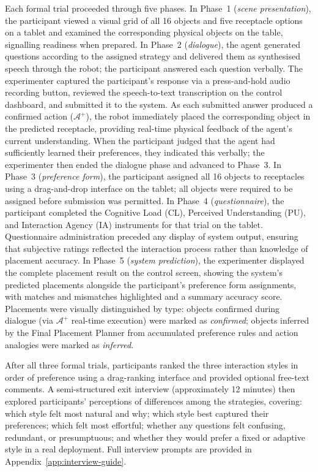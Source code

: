 \documentclass[manuscript,review,anonymous]{acmart}
\begin{document}
Each formal trial proceeded through five phases. In Phase~1 (\textit{scene presentation}), the participant viewed a visual grid of all 16 objects and five receptacle options on a tablet and examined the corresponding physical objects on the table, signalling readiness when prepared. In Phase~2 (\textit{dialogue}), the agent generated questions according to the assigned strategy and delivered them as synthesised speech through the robot; the participant answered each question verbally. The experimenter captured the participant's response via a press-and-hold audio recording button, reviewed the speech-to-text transcription on the control dashboard, and submitted it to the system. As each submitted answer produced a confirmed action ($\mathcal{A}^+$), the robot immediately placed the corresponding object in the predicted receptacle, providing real-time physical feedback of the agent's current understanding. When the participant judged that the agent had sufficiently learned their preferences, they indicated this verbally; the experimenter then ended the dialogue phase and advanced to Phase~3. In Phase~3 (\textit{preference form}), the participant assigned all 16 objects to receptacles using a drag-and-drop interface on the tablet; all objects were required to be assigned before submission was permitted. In Phase~4 (\textit{questionnaire}), the participant completed the Cognitive Load (CL), Perceived Understanding (PU), and Interaction Agency (IA) instruments for that trial on the tablet. Questionnaire administration preceded any display of system output, ensuring that subjective ratings reflected the interaction process rather than knowledge of placement accuracy. In Phase~5 (\textit{system prediction}), the experimenter displayed the complete placement result on the control screen, showing the system's predicted placements alongside the participant's preference form assignments, with matches and mismatches highlighted and a summary accuracy score. Placements were visually distinguished by type: objects confirmed during dialogue (via $\mathcal{A}^+$ real-time execution) were marked as \textit{confirmed}; objects inferred by the Final Placement Planner from accumulated preference rules and action analogies were marked as \textit{inferred}.

After all three formal trials, participants ranked the three interaction styles in order of preference using a drag-ranking interface and provided optional free-text comments. A semi-structured exit interview (approximately 12 minutes) then explored participants' perceptions of differences among the strategies, covering: which style felt most natural and why; which style best captured their preferences; which felt most effortful; whether any questions felt confusing, redundant, or presumptuous; and whether they would prefer a fixed or adaptive style in a real deployment. Full interview prompts are provided in Appendix~\ref{app:interview-guide}.
\end{document}
